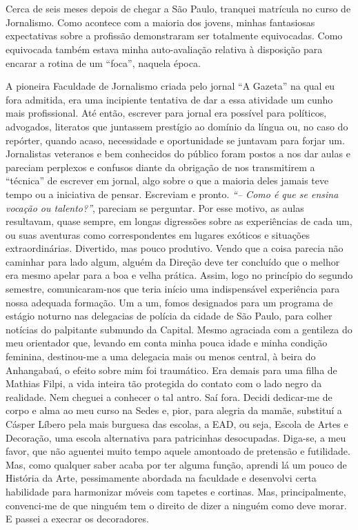 \chapter{}
Cerca de seis meses depois de chegar a São Paulo, tranquei matrícula no curso de Jornalismo.
Como acontece com a maioria dos jovens, minhas fantasiosas expectativas sobre a profissão demonstraram ser totalmente equivocadas.
Como equivocada também estava minha auto-avaliação relativa à disposição para encarar a rotina de um ``foca'', naquela época.


A pioneira Faculdade de Jornalismo criada pelo jornal ``A Gazeta'' na qual eu fora admitida, era uma incipiente tentativa de dar a essa atividade um cunho mais profissional.
Até então, escrever para jornal era possível para políticos, advogados, literatos que juntassem prestígio ao domínio da língua ou, no caso do repórter, quando acaso, necessidade e oportunidade se juntavam para forjar um.
Jornalistas veteranos e bem conhecidos do público foram postos a nos dar aulas e pareciam perplexos e confusos diante da obrigação de nos transmitirem a ``técnica'' de escrever em jornal, algo sobre o que a maioria deles jamais teve tempo ou a iniciativa de pensar.
Escreviam e pronto.
{\itshape``-- Como é que se ensina vocação ou talento?''}, pareciam se perguntar.
Por esse motivo, as aulas resultavam, quase sempre, em longas digressões sobre as experiências de cada um, ou suas aventuras como correspondentes em lugares exóticos e situações extraordinárias.
Divertido, mas pouco produtivo.
Vendo que a coisa parecia não caminhar para lado algum, alguém da Direção deve ter concluído que o melhor era mesmo apelar para a boa e velha prática.
Assim, logo no princípio do segundo semestre, comunicaram-nos que teria início uma indispensável experiência para nossa adequada formação.
Um a um, fomos designados para um programa de estágio noturno nas delegacias de polícia da cidade de São Paulo, para colher notícias do palpitante submundo da Capital.
 Mesmo agraciada com a gentileza do meu orientador que, levando em conta minha pouca idade e minha condição feminina, destinou-me a uma delegacia mais ou menos central, à beira do Anhangabaú, o efeito sobre mim foi traumático.
Era demais para uma filha de Mathias Filpi, a vida inteira tão protegida do contato com o lado negro da realidade.
Nem cheguei a conhecer o tal antro.
Saí fora.
Decidi dedicar-me de corpo e alma ao meu curso na Sedes e, pior, para alegria da mamãe, substituí a Cásper Líbero pela mais burguesa das escolas, a EAD, ou seja, Escola de Artes e Decoração, uma escola alternativa para patricinhas desocupadas.
Diga-se, a meu favor, que não aguentei muito tempo aquele amontoado de pretensão e futilidade.
Mas, como qualquer saber acaba por ter alguma função, aprendi lá um pouco de História da Arte, pessimamente abordada na faculdade e desenvolvi certa habilidade para harmonizar móveis com tapetes e cortinas.
Mas, principalmente, convenci-me de que ninguém tem o direito de dizer a ninguém como deve morar.
E passei a execrar os decoradores.


